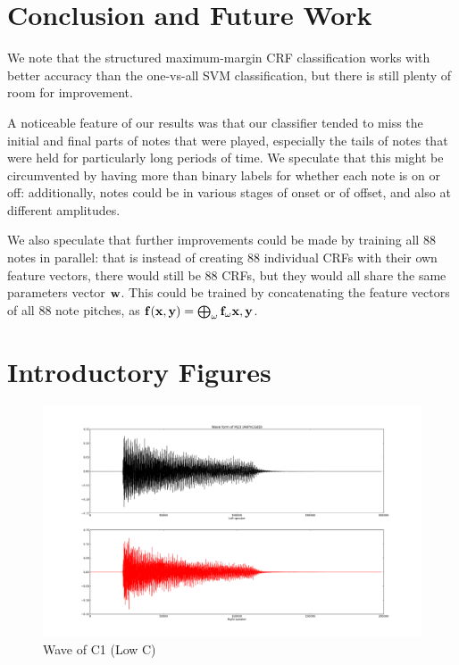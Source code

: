 \documentclass{article}
\begin{document}
\section{Conclusion and Future Work}
We note that the structured maximum-margin CRF classification works with
better accuracy than the one-vs-all SVM classification, but there is still
plenty of room for improvement.

A noticeable feature of our results was that our classifier tended to miss the
initial and final parts of notes that were played, especially the tails of
notes that were held for particularly long periods of time.
We speculate that this might be circumvented by having more than binary labels
for whether each note is on or off: additionally, notes could be in various
stages of onset or of offset, and also at different amplitudes.

We also speculate that further improvements could be made by training all 88
notes in parallel: that is instead of creating 88 individual CRFs with their
own feature vectors, there would still be 88 CRFs, but they would all share
the same parameters vector $\mathbf{w}$. This could be trained by concatenating the
feature vectors of all 88 note pitches, as $\mathbf{f}(\mathbf{x},\mathbf{y}) =
\bigoplus_{\omega}\mathbf{f}_{\omega}{\mathbf{x},\mathbf{y}}$. 





\section{Introductory Figures}
\begin{figure}
\includegraphics[scale=.13]{wave_m23.png}
\caption{Wave of C1 (Low C)}
\label{fig:wave}
\end{figure}
\end{document}
